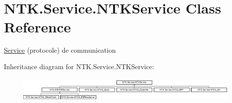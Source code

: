 \hypertarget{class_n_t_k_1_1_service_1_1_n_t_k_service}{}\section{N\+T\+K.\+Service.\+N\+T\+K\+Service Class Reference}
\label{class_n_t_k_1_1_service_1_1_n_t_k_service}


\mbox{\hyperlink{namespace_n_t_k_1_1_service}{Service}} (protocole) de communication  


Inheritance diagram for N\+T\+K.\+Service.\+N\+T\+K\+Service\+:\begin{figure}[H]
\begin{center}
\leavevmode
\includegraphics[height=1.244444cm]{d8/dcb/class_n_t_k_1_1_service_1_1_n_t_k_service}
\end{center}
\end{figure}

